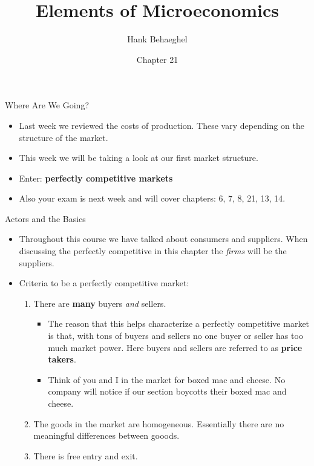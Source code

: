 \documentclass[aspectratio=169]{beamer}
\title{Elements of Microeconomics}
\author{Hank Behaeghel}
\institute{Johns Hopkins University}
\date{Chapter 21}
\begin{document}
\maketitle

\begin{frame}{Where Are We Going?}
    \begin{itemize}
        \item Last week we reviewed the costs of production. These vary depending on the structure of the market.
        \item This week we will be taking a look at our first market structure.
        \item Enter: \textbf{perfectly competitive markets}
        \item Also your exam is next week and will cover chapters: 6, 7, 8, 21, 13, 14.
    \end{itemize}
\end{frame}

\begin{frame}{Actors and the Basics}
    \begin{itemize}
        \item Throughout this course we have talked about consumers and suppliers. When discussing the perfectly competitive in this chapter the \textit{firms} will be the suppliers.
        \vspace*{5mm}
        \item Criteria to be a perfectly competitive market:
        \vspace*{5mm}
        \begin{enumerate}
            \item<2-> There are \textbf{many} buyers \textit{and} sellers.
            \begin{itemize}
                \item<3-> The reason that this helps characterize a perfectly competitive market is that, with tons of buyers and sellers no one buyer or seller has too much market power. Here buyers and sellers are referred to as \textbf{price takers}.
                \item<4-> Think of you and I in the market for boxed mac and cheese. No company will notice if our section boycotts their boxed mac and cheese. 
            \end{itemize}
            \item<5-> The goods in the market are homogeneous. Essentially there are no meaningful differences between gooods.
            \item<6-> There is free entry and exit.
        \end{enumerate}
    \end{itemize}
\end{frame}
\end{document}
